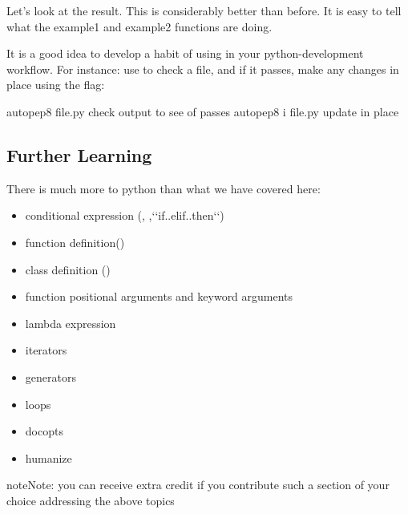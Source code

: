 Let's look at the result.
This is considerably better than before.
It is easy to tell what the example1 and example2 functions are doing.

It is a good idea to develop a habit of using  in your
python-development workflow.  For instance: use  to check
a file, and if it passes, make any changes in place using the 
flag:

\begin{sphinxVerbatim}[commandchars=\\\{\}]
\PYGZdl{} autopep8 file.py    \PYGZsh{} check output to see of passes
\PYGZdl{} autopep8 \PYGZhy{}i file.py \PYGZsh{} update in place
\end{sphinxVerbatim}


\subsection{Further Learning}
\label{\detokenize{lesson/prg/python_intro:further-learning}}\label{\detokenize{lesson/prg/python_intro:python-package-index}}
There is much more to python than what we have covered here:
\begin{itemize}
\item {} 
conditional expression (, ,{}`{}`if..elif..then{}`{}`)

\item {} 
function definition()

\item {} 
class definition ()

\item {} 
function positional arguments and keyword arguments

\item {} 
lambda expression

\item {} 
iterators

\item {} 
generators

\item {} 
loops

\item {} 
docopts

\item {} 
humanize

\end{itemize}

\begin{sphinxadmonition}{note}{Note:}
you can receive extra credit if you contribute such a
section of your choice addressing the above topics
\end{sphinxadmonition}


